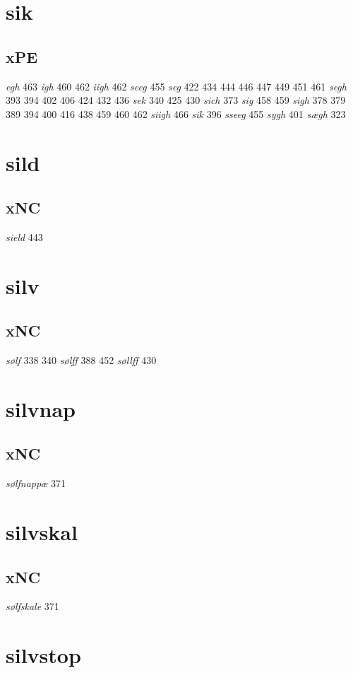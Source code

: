 \documentclass[a4paper,twocolumn]{article}
\begin{document}
\section{sik}
\label{sec:orga7c938d}
\subsection{xPE}
\label{sec:org0f140bb}
\emph{egh} 463 \emph{igh} 460 462 \emph{iigh} 462 \emph{seeg} 455 \emph{seg} 422 434 444 446 447 449 451 461 \emph{segh} 393 394 402 406 424 432 436 \emph{sek} 340 425 430 \emph{sich} 373 \emph{sig} 458 459 \emph{sigh} 378 379 389 394 400 416 438 459 460 462 \emph{siigh} 466 \emph{sik} 396 \emph{sseeg} 455 \emph{sygh} 401 \emph{sægh} 323 
\section{sild}
\label{sec:orgf2e9114}
\subsection{xNC}
\label{sec:org39f98e0}
\emph{sield} 443 
\section{silv}
\label{sec:org80e46f1}
\subsection{xNC}
\label{sec:orgf975780}
\emph{sølf} 338 340 \emph{sølff} 388 452 \emph{søllff} 430 
\section{silvnap}
\label{sec:org7dc4934}
\subsection{xNC}
\label{sec:org4fe549c}
\emph{sølfnappæ} 371 
\section{silvskal}
\label{sec:org6fd8d9b}
\subsection{xNC}
\label{sec:orgf532b7e}
\emph{sølfskale} 371 
\section{silvstop}
\label{sec:orgd6d3c09}
\end{document}
